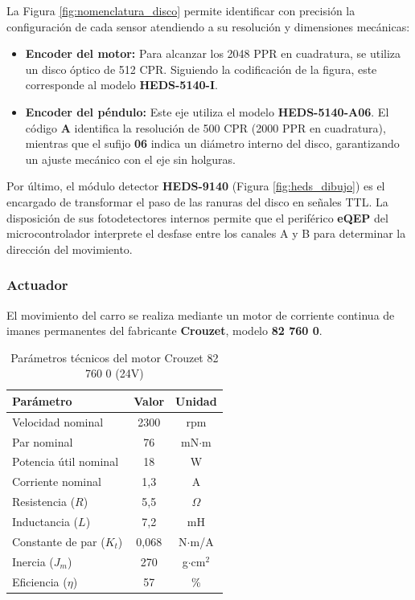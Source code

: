 \documentclass[11pt,fleqn]{book} %
\begin{document}
La Figura \ref{fig:nomenclatura_disco} permite identificar con precisión la configuración de cada sensor atendiendo a su resolución y dimensiones mecánicas:
\begin{itemize}
	\item \textbf{Encoder del motor:} Para alcanzar los 2048 PPR en cuadratura, se utiliza un disco óptico de 512 CPR. Siguiendo la codificación de la figura, este corresponde al modelo \textbf{HEDS-5140-I}.
	
	\item \textbf{Encoder del péndulo:} Este eje utiliza el modelo \textbf{HEDS-5140-A06}. El código \textbf{A} identifica la resolución de 500 CPR (2000 PPR en cuadratura), mientras que el sufijo \textbf{06} indica un diámetro interno del disco, garantizando un ajuste mecánico con el eje sin holguras.
\end{itemize}

Por último, el módulo detector \textbf{HEDS-9140} (Figura \ref{fig:heds_dibujo}) es el encargado de transformar el paso de las ranuras del disco en señales TTL. La disposición de sus fotodetectores internos permite que el periférico \textbf{eQEP} del microcontrolador interprete el desfase entre los canales A y B para determinar la dirección del movimiento.

\newpage

\subsubsection{Actuador}
El movimiento del carro se realiza mediante un motor de corriente continua de imanes permanentes del fabricante \textbf{Crouzet}, modelo \textbf{82 760 0}. 

\begin{table}[ht]
	\centering
	\caption{Parámetros técnicos del motor Crouzet 82 760 0 (24V) \cite{crouzet_82760_ds}}
	\label{tab:datos_motor}
	\begin{tabular}{lcc}
		\hline
		\textbf{Parámetro} & \textbf{Valor} & \textbf{Unidad} \\ \hline
		Velocidad nominal & 2300 & rpm \\
		Par nominal & 76 & mN$\cdot$m \\
		Potencia útil nominal & 18 & W \\
		Corriente nominal & 1,3 & A \\
		Resistencia ($R$) & 5,5 & $\Omega$ \\
		Inductancia ($L$) & 7,2 & mH \\
		Constante de par ($K_t$) & 0,068 & N$\cdot$m/A \\
		Inercia ($J_m$) & 270 & g$\cdot$cm$^2$ \\ 
		Eficiencia ($\eta$) & 57 & \% \\ \hline
	\end{tabular}
\end{table}
\end{document}
